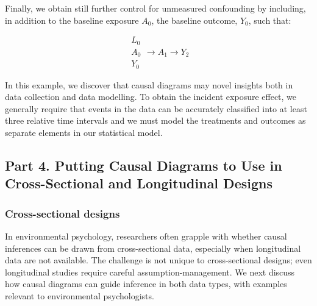 \documentclass[
  singlecolumn]{article}
\begin{document}
Finally, we obtain still further control for unmeasured confounding by
including, in addition to the baseline exposure \(A_0\), the baseline
outcome, \(Y_0\), such that:

\[
\boxed{
\begin{aligned}
L_{0} \\
A_{0} \\
Y_{0}
\end{aligned}
}
\to A_{1} \to Y_{2}
\]

In this example, we discover that causal diagrams may novel insights
both in data collection and data modelling. To obtain the incident
exposure effect, we generally require that events in the data can be
accurately classified into at least three relative time intervals and we
must model the treatments and outcomes as separate elements in our
statistical model.

\subsection{Part 4. Putting Causal Diagrams to Use in Cross-Sectional
and Longitudinal
Designs}\label{part-4.-putting-causal-diagrams-to-use-in-cross-sectional-and-longitudinal-designs}

\subsubsection{Cross-sectional designs}\label{cross-sectional-designs}

In environmental psychology, researchers often grapple with whether
causal inferences can be drawn from cross-sectional data, especially
when longitudinal data are not available. The challenge is not unique to
cross-sectional designs; even longitudinal studies require careful
assumption-management. We next discuss how causal diagrams can guide
inference in both data types, with examples relevant to environmental
psychologists.
\end{document}
